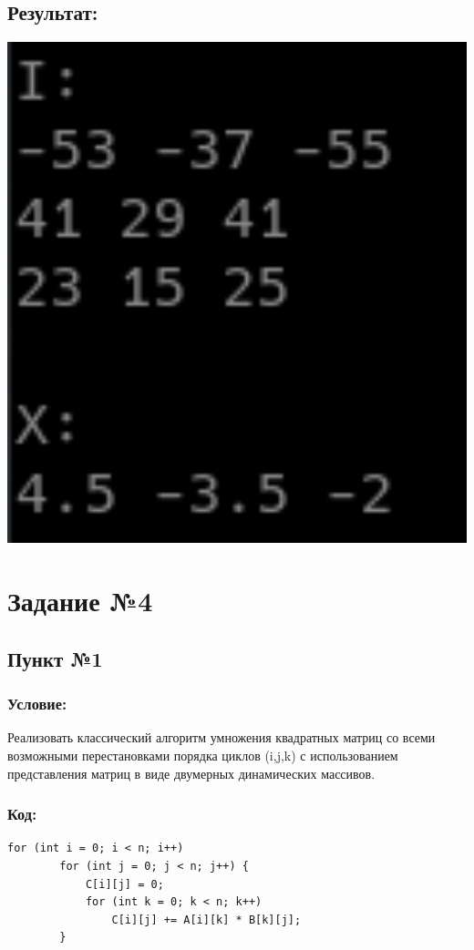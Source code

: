 \documentclass[a4paper]{article}
\begin{document}
\subsection{Результат:}
\includegraphics[width=1\textwidth]{3.png}
\newpage
\section{Задание №4} 
\subsection{Пункт №1}
\subsubsection{Условие:}
Реализовать классический алгоритм умножения квадратных матриц со всеми возможными перестановками порядка циклов (i,j,k) с использованием представления матриц в виде двумерных динамических массивов.
\subsubsection{Код:}\scriptsize
\begin{verbatim}
for (int i = 0; i < n; i++)
        for (int j = 0; j < n; j++) {
            C[i][j] = 0;
            for (int k = 0; k < n; k++)
                C[i][j] += A[i][k] * B[k][j];
        }
\end{verbatim}\normalsize
\end{document}
